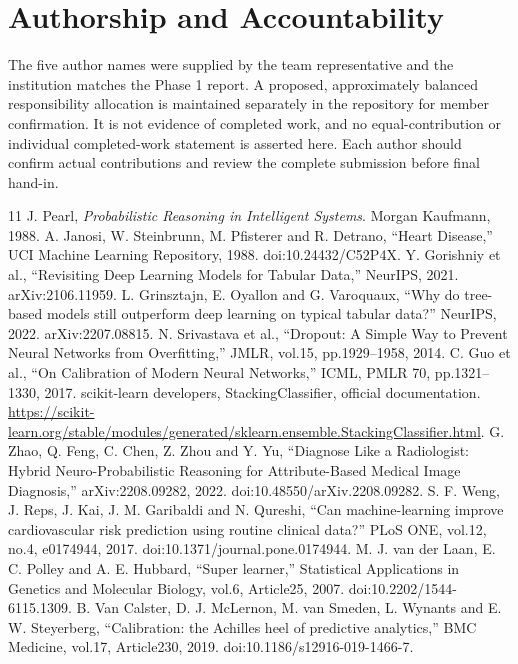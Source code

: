 \documentclass[conference]{IEEEtran}
\begin{document}
\section{Authorship and Accountability}
The five author names were supplied by the team representative and the institution matches the Phase 1 report. A proposed, approximately balanced responsibility allocation is maintained separately in the repository for member confirmation. It is not evidence of completed work, and no equal-contribution or individual completed-work statement is asserted here. Each author should confirm actual contributions and review the complete submission before final hand-in.

\begin{thebibliography}{11}
 J. Pearl, \emph{Probabilistic Reasoning in Intelligent Systems}. Morgan Kaufmann, 1988.
 A. Janosi, W. Steinbrunn, M. Pfisterer and R. Detrano, ``Heart Disease,'' UCI Machine Learning Repository, 1988. doi:10.24432/C52P4X.
 Y. Gorishniy et al., ``Revisiting Deep Learning Models for Tabular Data,'' NeurIPS, 2021. arXiv:2106.11959.
 L. Grinsztajn, E. Oyallon and G. Varoquaux, ``Why do tree-based models still outperform deep learning on typical tabular data?'' NeurIPS, 2022. arXiv:2207.08815.
 N. Srivastava et al., ``Dropout: A Simple Way to Prevent Neural Networks from Overfitting,'' JMLR, vol.15, pp.1929--1958, 2014.
 C. Guo et al., ``On Calibration of Modern Neural Networks,'' ICML, PMLR 70, pp.1321--1330, 2017.
 scikit-learn developers, StackingClassifier, official documentation. \url{https://scikit-learn.org/stable/modules/generated/sklearn.ensemble.StackingClassifier.html}.
 G. Zhao, Q. Feng, C. Chen, Z. Zhou and Y. Yu, ``Diagnose Like a Radiologist: Hybrid Neuro-Probabilistic Reasoning for Attribute-Based Medical Image Diagnosis,'' arXiv:2208.09282, 2022. doi:10.48550/arXiv.2208.09282.
 S. F. Weng, J. Reps, J. Kai, J. M. Garibaldi and N. Qureshi, ``Can machine-learning improve cardiovascular risk prediction using routine clinical data?'' PLoS ONE, vol.12, no.4, e0174944, 2017. doi:10.1371/journal.pone.0174944.
 M. J. van der Laan, E. C. Polley and A. E. Hubbard, ``Super learner,'' Statistical Applications in Genetics and Molecular Biology, vol.6, Article25, 2007. doi:10.2202/1544-6115.1309.
 B. Van Calster, D. J. McLernon, M. van Smeden, L. Wynants and E. W. Steyerberg, ``Calibration: the Achilles heel of predictive analytics,'' BMC Medicine, vol.17, Article230, 2019. doi:10.1186/s12916-019-1466-7.

\end{thebibliography}
\end{document}
